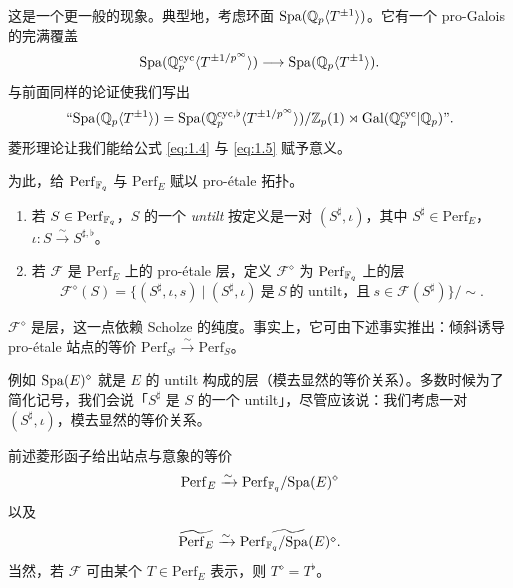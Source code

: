 这是一个更一般的现象。典型地，考虑环面 $\mathrm{Spa}(\mathbb{Q}_p\langle T^{\pm1}\rangle)$。它有一个 pro-Galois 的完满覆盖
\[
  \mathrm{Spa}(\mathbb{Q}_p^{\mathrm{cyc}}\langle T^{\pm1/p^\infty}\rangle)\longrightarrow\mathrm{Spa}(\mathbb{Q}_p\langle T^{\pm1}\rangle).
\]
与前面同样的论证使我们写出
\begin{equation}\label{eq:1.5}
  \text{“}\mathrm{Spa}(\mathbb{Q}_p\langle T^{\pm1}\rangle)=\mathrm{Spa}(\mathbb{Q}_p^{\mathrm{cyc},\flat}\langle T^{\pm1/p^\infty}\rangle)/\mathbb{Z}_p(1)\rtimes\operatorname{Gal}(\mathbb{Q}_p^{\mathrm{cyc}}|\mathbb{Q}_p)\text{”}.
\end{equation}
菱形理论让我们能给公式 \eqref{eq:1.4} 与 \eqref{eq:1.5} 赋予意义。

为此，给 $\mathrm{Perf}_{\mathbb{F}_q}$ 与 $\mathrm{Perf}_E$ 赋以 pro-étale 拓扑。

\begin{definition}\label{def:1.8}
\begin{enumerate}[label=(\arabic*)]
  \item 若 $S\in\mathrm{Perf}_{\mathbb{F}_q}$，$S$ 的一个 \emph{untilt} 按定义是一对 $(S^\sharp,\iota)$，其中 $S^\sharp\in\mathrm{Perf}_E$，$\iota\colon S\xrightarrow{\sim}S^{\sharp,\flat}$。
  \item 若 $\mathcal{F}$ 是 $\mathrm{Perf}_E$ 上的 pro-étale 层，定义 $\mathcal{F}^\diamond$ 为 $\mathrm{Perf}_{\mathbb{F}_q}$ 上的层
  \[
    \mathcal{F}^\diamond(S)=\bigl\{(S^\sharp,\iota,s)\ \big|\ (S^\sharp,\iota)\ \text{是}\ S\ \text{的 untilt，且}\ s\in\mathcal{F}(S^\sharp)\bigr\}/\sim.
  \]
\end{enumerate}
\end{definition}

\begin{remark}\label{rem:1.9}
$\mathcal{F}^\diamond$ 是层，这一点依赖 Scholze 的纯度。事实上，它可由下述事实推出：倾斜诱导 pro-étale 站点的等价 $\mathrm{Perf}_{S^\sharp}\xrightarrow{\sim}\mathrm{Perf}_S$。
\end{remark}

\leavevmode{}例如 $\mathrm{Spa}(E)^\diamond$ 就是 $E$ 的 untilt 构成的层（模去显然的等价关系）。多数时候为了简化记号，我们会说「$S^\sharp$ 是 $S$ 的一个 untilt」，尽管应该说：我们考虑一对 $(S^\sharp,\iota)$，模去显然的等价关系。

前述菱形函子给出站点与意象的等价
\[
  \mathrm{Perf}_E\xrightarrow{\sim}\mathrm{Perf}_{\mathbb{F}_q}/\mathrm{Spa}(E)^\diamond
\]
以及
\[
  \widetilde{\mathrm{Perf}_E}\xrightarrow{\sim}\widetilde{\mathrm{Perf}_{\mathbb{F}_q}/\mathrm{Spa}(E)^\diamond}.
\]
当然，若 $\mathcal{F}$ 可由某个 $T\in\mathrm{Perf}_E$ 表示，则 $T^\diamond=T^\flat$。

